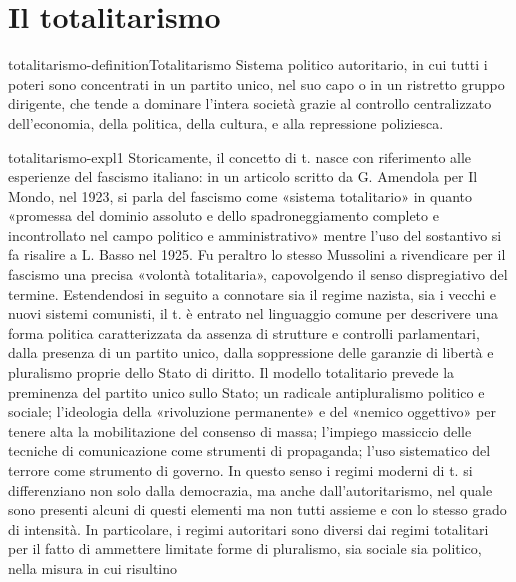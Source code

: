 \documentclass[preview]{standalone}
\begin{document}
\genpage

\section{Il totalitarismo}

\begin{snippetdefinition}{totalitarismo-definition}{Totalitarismo}
    Sistema politico autoritario, in cui tutti i poteri sono concentrati in un partito unico, nel suo
    capo o in un ristretto gruppo dirigente, che tende a dominare l'intera società grazie al controllo
    centralizzato dell'economia, della politica, della cultura, e alla repressione poliziesca.
\end{snippetdefinition}

\begin{snippet}{totalitarismo-expl1}
    Storicamente, il concetto di t. nasce con riferimento alle esperienze del fascismo italiano: in un
    articolo scritto da G. Amendola per Il Mondo, nel 1923, si parla del fascismo come «sistema
    totalitario» in quanto «promessa del dominio assoluto e dello spadroneggiamento completo e
    incontrollato nel campo politico e amministrativo» mentre l'uso del sostantivo si fa risalire a L.
    Basso nel 1925. Fu peraltro lo stesso Mussolini a rivendicare per il fascismo una precisa
    «volontà totalitaria», capovolgendo il senso dispregiativo del termine. Estendendosi in seguito
    a connotare sia il regime nazista, sia i vecchi e nuovi sistemi comunisti, il t. è entrato nel
    linguaggio comune per descrivere una forma politica caratterizzata da assenza di strutture e
    controlli parlamentari, dalla presenza di un partito unico, dalla soppressione delle garanzie di
    libertà e pluralismo proprie dello Stato di diritto. Il modello totalitario prevede la preminenza
    del partito unico sullo Stato; un radicale antipluralismo politico e sociale; l'ideologia della
    «rivoluzione permanente» e del «nemico oggettivo» per tenere alta la mobilitazione del
    consenso di massa; l'impiego massiccio delle tecniche di comunicazione come strumenti
    di propaganda; l'uso sistematico del terrore come strumento di governo. In questo senso i
    regimi moderni di t. si differenziano non solo dalla democrazia, ma anche dall'autoritarismo,
    nel quale sono presenti alcuni di questi elementi ma non tutti assieme e con lo stesso grado di
    intensità. In particolare, i regimi autoritari sono diversi dai regimi totalitari per il fatto di
    ammettere limitate forme di pluralismo, sia sociale sia politico, nella misura in cui risultino

\end{snippet}
\end{document}
